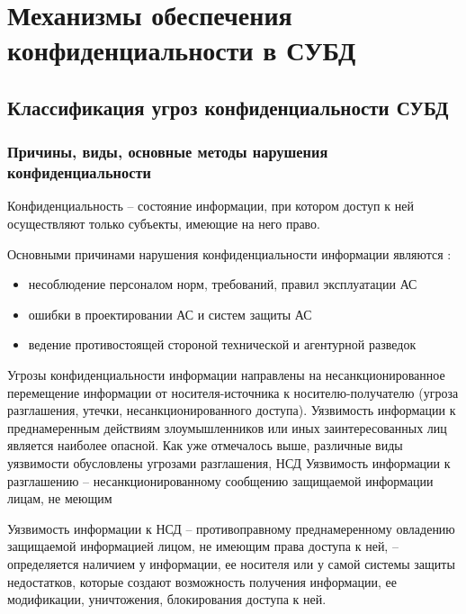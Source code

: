 \section{Механизмы обеспечения конфиденциальности в СУБД}
\subsection{Классификация угроз конфиденциальности СУБД}

\subsubsection{Причины, виды, основные методы нарушения конфиденциальности}

Конфиденциальность – состояние информации, при котором доступ к ней осуществляют только субъекты,
имеющие на него право.

Основными причинами нарушения конфиденциальности информации являются \cite{o-salo}:
\begin{itemize}
    \item несоблюдение персоналом норм, требований, правил эксплуатации АС
    \item ошибки в проектировании АС и систем защиты АС
    \item ведение противостоящей стороной технической и агентурной разведок
\end{itemize}

Угрозы конфиденциальности информации направлены на несанкционированное перемещение информации от
носителя-источника к носителю-получателю (угроза разглашения, утечки, несанкционированного доступа).
Уязвимость информации к преднамеренным действиям злоумышленников или иных заинтересованных лиц является
наиболее опасной. Как уже отмечалось выше, различные виды уязвимости обусловлены угрозами разглашения, НСД %
Уязвимость информации к разглашению – несанкционированному сообщению защищаемой информации лицам, не меющим

Уязвимость информации к НСД – противоправному преднамеренному овладению защищаемой информацией лицом,
не имеющим права доступа к ней, – определяется наличием у информации, ее носителя или у самой системы
защиты недостатков, которые создают возможность получения информации, ее модификации, уничтожения,
блокирования доступа к ней.

